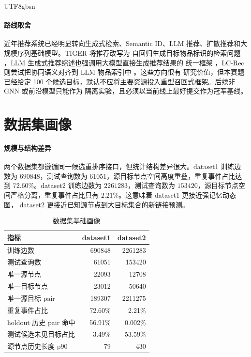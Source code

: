 \documentclass[letterpaper,11pt,leqno]{article}
\begin{document}
\begin{CJK*}{UTF8}{gbsn}
\paragraph{路线取舍}
近年推荐系统已经明显转向生成式检索、Semantic ID、LLM 推荐、扩散推荐和大规模序列基础模型。TIGER 将推荐改写为
自回归生成目标物品标识的检索问题 \citep{rajput2023generative}，LLM 生成式推荐综述也强调用大模型直接生成推荐结果的
统一框架 \citep{li2024llmgenrec}，LC-Rec 则尝试把协同语义对齐到 LLM 物品索引中 \citep{zheng2023lcrec}。这些方向很有
研究价值，但本赛题已经给定 100 个候选目标，默认不应将主要资源投入重型召回式框架。后续非 GNN 或前沿模型只能作为
隔离实验，且必须以当前线上最好提交作为冠军基线。

\section{数据集画像}

\paragraph{规模与结构差异}
两个数据集都遵循同一候选重排序接口，但统计结构差异很大。dataset1 训练边数为 $690848$，测试查询数为
$61051$，源目标节点空间高度重叠，重复事件占比达到 $72.60\%$。dataset2 训练边数为 $2261283$，测试查询数为
$153420$，源目标节点空间严格分离，重复事件占比只有 $2.21\%$。这意味着 dataset1 更接近强记忆动态图，
dataset2 更接近已知源节点到大目标集合的新链接预测。

\begin{table}[H]
\caption{数据集基础画像}
\label{t:data-profile}
\begin{tabular*}{\linewidth}{@{\extracolsep{\fill}}lrr}
\toprule
指标 & dataset1 & dataset2 \\
\midrule
训练边数 & 690848 & 2261283 \\
测试查询数 & 61051 & 153420 \\
唯一源节点 & 22093 & 12708 \\
唯一目标节点 & 23012 & 50640 \\
唯一源目标 pair & 189307 & 2211275 \\
重复事件占比 & 72.60\% & 2.21\% \\
holdout 历史 pair 命中 & 56.91\% & 0.002\% \\
测试候选未见目标占比 & 3.49\% & 53.59\% \\
源节点历史长度 p90 & 79 & 430 \\
\bottomrule
\end{tabular*}
\end{table}


\end{CJK*}
\end{document}
